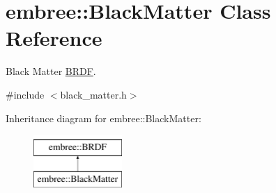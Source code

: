 \hypertarget{classembree_1_1_black_matter}{
\section{embree::BlackMatter Class Reference}
\label{classembree_1_1_black_matter}
}


Black Matter \hyperlink{classembree_1_1_b_r_d_f}{BRDF}.  




{\ttfamily \#include $<$black\_\-matter.h$>$}

Inheritance diagram for embree::BlackMatter:\begin{figure}[H]
\begin{center}
\leavevmode
\includegraphics[height=2.000000cm]{classembree_1_1_black_matter}
\end{center}
\end{figure}
